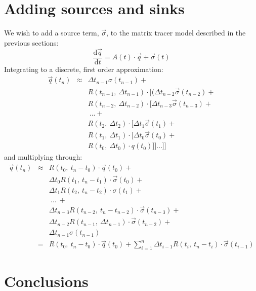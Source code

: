 \documentclass[11pt]{article}
\begin{document}
\section{Adding sources and sinks}

We wish to add a source term, $\vec \sigma$, to the matrix tracer model
described in the previous sections:
\begin{equation}
\frac{\mathrm d \vec q}{\mathrm d t} = A(t) \cdot \vec q + \vec \sigma(t)
\end{equation}
Integrating to a discrete, first order approximation:
\begin{eqnarray}
  \vec q(t_n) 
  & \approx & \Delta t_{n-1} \sigma(t_{n-1}) + \nonumber \\
  & & R(t_{n-1}, ~ \Delta t_{n-1}) \cdot [(\Delta t_{n-2} \vec \sigma(t_{n-2}) + \nonumber \\
  & & R(t_{n-2}, ~ \Delta t_{n-2}) \cdot [\Delta t_{n-3} \vec \sigma(t_{n-3}) + \nonumber \\
  & & ~... + \nonumber \\
  & & R(t_2, ~ \Delta t_2) \cdot [\Delta t_1 \vec \sigma(t_1) + \nonumber \\
  & & R(t_1, ~ \Delta t_1) \cdot [\Delta t_0 \vec \sigma(t_0) + \nonumber \\
  & & R(t_0, ~ \Delta t_0) \cdot q(t_0) ]]...]]
\end{eqnarray}
and multiplying through:
\begin{eqnarray}
\vec q(t_n) 
  & \approx & R(t_0, ~ t_n-t_0) \cdot \vec q(t_0) + \nonumber \\
  & & \Delta t_0 R(t_1, ~ t_n-t_1) \cdot \vec \sigma(t_0) + \nonumber \\
  & & \Delta t_1 R(t_2, ~ t_n-t_2) \cdot \sigma(t_1) + \nonumber \\
  & & ~...~+ \nonumber \\ 
  & & \Delta t_{n-3} R(t_{n-2}, ~ t_n-t_{n-2}) \cdot \vec\sigma(t_{n-3}) + \nonumber \\
  & & \Delta t_{n-2} R(t_{n-1}, ~ \Delta t_{n-1}) \cdot \vec \sigma(t_{n-2}) + \nonumber \\
  & & \Delta t_{n-1} \sigma(t_{n-1}) \\
  & = & R(t_0,~t_n-t_0) \cdot \vec q(t_0) + 
  \sum_{i=1}^{n} \Delta t_{i-1} R(t_i,~t_n-t_i) \cdot \vec \sigma(t_{i-1})
\end{eqnarray}

\section{Conclusions}
\end{document}
